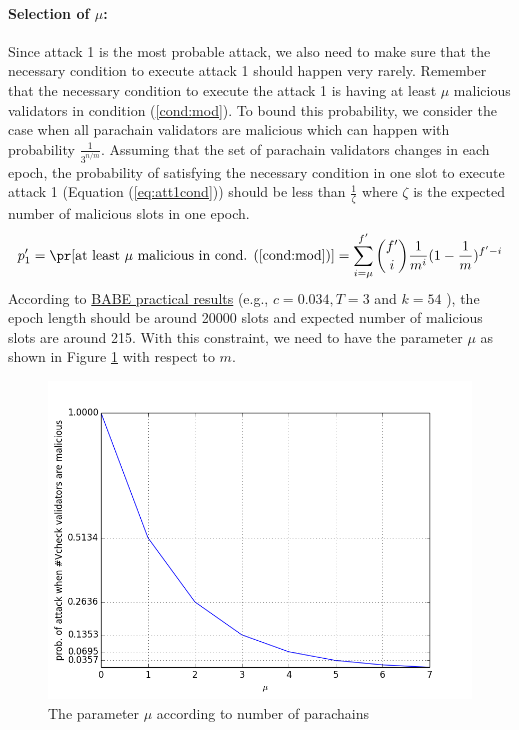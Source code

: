 \paragraph{Selection of $\mu$:} Since attack 1 is the most probable attack, we also need to make sure that the necessary condition to execute attack 1 should happen very rarely. Remember that the necessary condition to execute the attack 1 is having at least $\mu$ malicious validators in condition (\ref{cond:mod}).  To bound this probability, we consider the case when all parachain validators are malicious which can happen with probability $\frac{1}{3^{n/m}}$. Assuming that the set of parachain validators changes in each epoch, the probability of satisfying the necessary condition in one slot to execute attack 1 (Equation (\ref{eq:att1cond})) should be less than $\frac{1}{\zeta}$ where $\zeta$ is the expected number of malicious slots in one epoch. 
\begin{equation}\label{eq:att1cond}
    p'_1 = \pr[\text{at least }\mu \text{ malicious in cond. (\ref{cond:mod})}] = \sum_{i = \mu}^{f'}\binom{f'}{i}\frac{1}{m^i}(1-\frac{1}{m})^{f'-i}
\end{equation}
According to  \href{http://research.web3.foundation/en/latest/polkadot/BABE/Babe/#6-practical-results}{BABE practical results} (e.g., $c = 0.034, T = 3$ and $k = 54$ ), the epoch length should be around 20000 slots and expected number of malicious slots are around 215. With this constraint, we need to have the parameter $\mu$ as shown in Figure \ref{fig:muval} with respect to $m$.  

\begin{figure}[h]\centering
	  \includegraphics[width=16cm]{images/muval.png}
	  \caption{The parameter $\mu$ according to number of parachains}
	  \label{fig:muval}
\end{figure}

